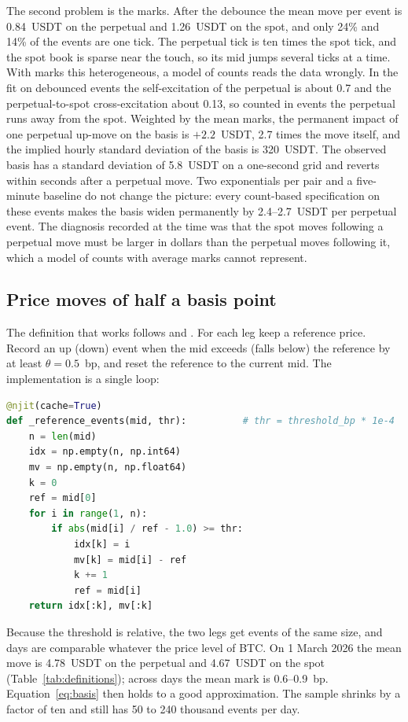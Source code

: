 \documentclass[a4paper,11pt]{article}
\begin{document}
The second problem is the marks. After the debounce the mean move per event is 0.84~USDT on the perpetual and 1.26~USDT on the spot, and only 24\% and 14\% of the events are one tick. The perpetual tick is ten times the spot tick, and the spot book is sparse near the touch, so its mid jumps several ticks at a time. With marks this heterogeneous, a model of counts reads the data wrongly. In the fit on debounced events the self-excitation of the perpetual is about 0.7 and the perpetual-to-spot cross-excitation about 0.13, so counted in events the perpetual runs away from the spot. Weighted by the mean marks, the permanent impact of one perpetual up-move on the basis is $+2.2$~USDT, 2.7 times the move itself, and the implied hourly standard deviation of the basis is 320~USDT. The observed basis has a standard deviation of 5.8~USDT on a one-second grid and reverts within seconds after a perpetual move. Two exponentials per pair and a five-minute baseline do not change the picture: every count-based specification on these events makes the basis widen permanently by 2.4--2.7~USDT per perpetual event. The diagnosis recorded at the time was that the spot moves following a perpetual move must be larger in dollars than the perpetual moves following it, which a model of counts with average marks cannot represent.

\subsection{Price moves of half a basis point}

The definition that works follows \cite{dafonseca2015} and \cite{bacry2013}. For each leg keep a reference price. Record an up (down) event when the mid exceeds (falls below) the reference by at least $\theta = 0.5$~bp, and reset the reference to the current mid. The implementation is a single loop:

\begin{lstlisting}[language=Python]
@njit(cache=True)
def _reference_events(mid, thr):          # thr = threshold_bp * 1e-4
    n = len(mid)
    idx = np.empty(n, np.int64)
    mv = np.empty(n, np.float64)
    k = 0
    ref = mid[0]
    for i in range(1, n):
        if abs(mid[i] / ref - 1.0) >= thr:
            idx[k] = i
            mv[k] = mid[i] - ref
            k += 1
            ref = mid[i]
    return idx[:k], mv[:k]
\end{lstlisting}

Because the threshold is relative, the two legs get events of the same size, and days are comparable whatever the price level of BTC. On 1 March 2026 the mean move is 4.78~USDT on the perpetual and 4.67~USDT on the spot (Table~\ref{tab:definitions}); across days the mean mark is 0.6--0.9~bp. Equation~\eqref{eq:basis} then holds to a good approximation. The sample shrinks by a factor of ten and still has 50 to 240 thousand events per day.
\end{document}
